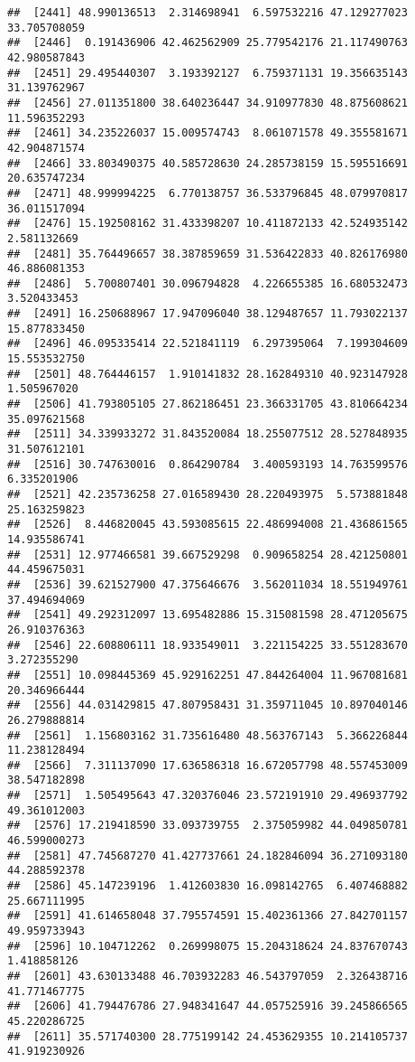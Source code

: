 \documentclass[
]{article}
\begin{document}
\begin{verbatim}
##  [2441] 48.990136513  2.314698941  6.597532216 47.129277023 33.705708059
##  [2446]  0.191436906 42.462562909 25.779542176 21.117490763 42.980587843
##  [2451] 29.495440307  3.193392127  6.759371131 19.356635143 31.139762967
##  [2456] 27.011351800 38.640236447 34.910977830 48.875608621 11.596352293
##  [2461] 34.235226037 15.009574743  8.061071578 49.355581671 42.904871574
##  [2466] 33.803490375 40.585728630 24.285738159 15.595516691 20.635747234
##  [2471] 48.999994225  6.770138757 36.533796845 48.079970817 36.011517094
##  [2476] 15.192508162 31.433398207 10.411872133 42.524935142  2.581132669
##  [2481] 35.764496657 38.387859659 31.536422833 40.826176980 46.886081353
##  [2486]  5.700807401 30.096794828  4.226655385 16.680532473  3.520433453
##  [2491] 16.250688967 17.947096040 38.129487657 11.793022137 15.877833450
##  [2496] 46.095335414 22.521841119  6.297395064  7.199304609 15.553532750
##  [2501] 48.764446157  1.910141832 28.162849310 40.923147928  1.505967020
##  [2506] 41.793805105 27.862186451 23.366331705 43.810664234 35.097621568
##  [2511] 34.339933272 31.843520084 18.255077512 28.527848935 31.507612101
##  [2516] 30.747630016  0.864290784  3.400593193 14.763599576  6.335201906
##  [2521] 42.235736258 27.016589430 28.220493975  5.573881848 25.163259823
##  [2526]  8.446820045 43.593085615 22.486994008 21.436861565 14.935586741
##  [2531] 12.977466581 39.667529298  0.909658254 28.421250801 44.459675031
##  [2536] 39.621527900 47.375646676  3.562011034 18.551949761 37.494694069
##  [2541] 49.292312097 13.695482886 15.315081598 28.471205675 26.910376363
##  [2546] 22.608806111 18.933549011  3.221154225 33.551283670  3.272355290
##  [2551] 10.098445369 45.929162251 47.844264004 11.967081681 20.346966444
##  [2556] 44.031429815 47.807958431 31.359711045 10.897040146 26.279888814
##  [2561]  1.156803162 31.735616480 48.563767143  5.366226844 11.238128494
##  [2566]  7.311137090 17.636586318 16.672057798 48.557453009 38.547182898
##  [2571]  1.505495643 47.320376046 23.572191910 29.496937792 49.361012003
##  [2576] 17.219418590 33.093739755  2.375059982 44.049850781 46.599000273
##  [2581] 47.745687270 41.427737661 24.182846094 36.271093180 44.288592378
##  [2586] 45.147239196  1.412603830 16.098142765  6.407468882 25.667111995
##  [2591] 41.614658048 37.795574591 15.402361366 27.842701157 49.959733943
##  [2596] 10.104712262  0.269998075 15.204318624 24.837670743  1.418858126
##  [2601] 43.630133488 46.703932283 46.543797059  2.326438716 41.771467775
##  [2606] 41.794476786 27.948341647 44.057525916 39.245866565 45.220286725
##  [2611] 35.571740300 28.775199142 24.453629355 10.214105737 41.919230926

\end{verbatim}
\end{document}
